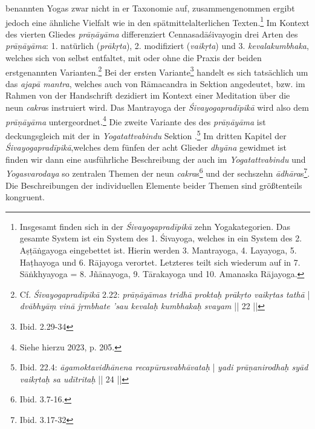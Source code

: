 benannten Yogas zwar nicht in er Taxonomie auf, zusammengenommen ergibt jedoch eine ähnliche Vielfalt wie in den spätmittelalterlichen Texten.\footnote{Insgesamt finden sich in der \textit{Śivayogapradīpikā} zehn Yogakategorien. Das gesamte System ist ein System des 1. Śivayoga, welches in ein System des 2. Aṣṭāṅgayoga eingebettet ist. Hierin werden 3. Mantrayoga, 4. Layayoga, 5. Haṭhayoga und 6. Rājayoga verortet. Letzteres teilt sich wiederum auf in 7. Sāṅkhyayoga = 8. Jñānayoga, 9. Tārakayoga und 10. Amanaska Rājayoga.}   
Im Kontext des vierten Gliedes \textit{prāṇāyāma} differenziert Cennasadāśivayogin drei Arten des \textit{prāṇāyāma}: 1. natürlich (\textit{prākṛta}), 2. modifiziert (\textit{vaikṛta}) und 3. \textit{kevalakumbhaka}, welches sich von selbst entfaltet, mit oder ohne die Praxis der beiden erstgenannten Varianten.\footnote{Cf. \textit{Śivayogapradīpikā} 2.22: \textit{prāṇāyāmas tridhā proktaḥ prākṛto vaikṛtas tathā} | \textit{dvābhyāṃ vinā jṛmbhate 'sau kevalaḥ kumbhakaḥ svayam} || 22 ||} Bei der ersten Variante\footnote{Ibid. 2.29-34} handelt es sich tatsächlich um das \textit{ajapā mantra}, welches auch von Rāmacandra in Sektion  angedeutet, bzw. im Rahmen von der Handschrift  dezidiert im Kontext einer Meditation über die neun \textit{cakra}s instruiert wird. Das Mantrayoga der \textit{Śivayogapradīpikā} wird also dem \textit{prāṇāyāma} untergeordnet.\footnote{Siehe hierzu \citeauthor{powell2023} 2023, p. 205.} Die zweite Variante des des \textit{prāṇāyāma} ist deckungsgleich mit der in \textit{Yogatattvabindu} Sektion .\footnote{Ibid. 22.4: \textit{āgamoktavidhānena recapūrasvabhāvataḥ} | \textit{yadi prāṇanirodhaḥ syād vaikṛtaḥ sa udītritaḥ} || 24 ||} Im dritten Kapitel der \textit{Śivayogapradīpikā},welches dem fünfen der acht Glieder \textit{dhyāna} gewidmet ist finden wir dann eine ausführliche Beschreibung der auch im \textit{Yogatattvabindu} und \textit{Yogasvarodaya} so zentralen Themen der neun \textit{cakra}s\footnote{Ibid. 3.7-16.} und der sechszehn \textit{ādhāra}s\footnote{Ibid. 3.17-32}. Die Beschreibungen der individuellen Elemente beider Themen sind größtenteils kongruent.  

